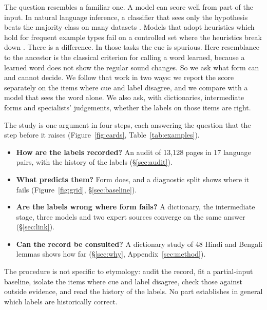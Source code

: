 \documentclass[11pt]{article}
\begin{document}
The question resembles a familiar one. A model can score well from part of the input. In natural language inference, a classifier that sees only the hypothesis beats the majority class on many datasets \citep{poliak2018hypothesis,gururangan2018annotation}. Models that adopt heuristics which hold for frequent example types fail on a controlled set where the heuristics break down \citep{mccoy2019right}. There is a difference. In those tasks the cue is spurious. Here resemblance to the ancestor is the classical criterion for calling a word learned, because a learned word does not show the regular sound changes. So we ask what form can and cannot decide. We follow that work in two ways: we report the score separately on the items where cue and label disagree, and we compare with a model that sees the word alone. We also ask, with dictionaries, intermediate forms and specialists' judgements, whether the labels on those items are right.

The study is one argument in four steps, each answering the question that the step before it raises (Figure~\ref{fig:cards}, Table~\ref{tab:examples}).
\begin{itemize}
\item \textbf{How are the labels recorded?} An audit of 13,128 pages in 17 language pairs, with the history of the labels (\S\ref{sec:audit}).
\item \textbf{What predicts them?} Form does, and a diagnostic split shows where it fails (Figure~\ref{fig:grid}, \S\ref{sec:baseline}).
\item \textbf{Are the labels wrong where form fails?} A dictionary, the intermediate stage, three models and two expert sources converge on the same answer (\S\ref{sec:link}).
\item \textbf{Can the record be consulted?} A dictionary study of 48 Hindi and Bengali lemmas shows how far (\S\ref{sec:why}, Appendix~\ref{sec:method}).
\end{itemize}
The procedure is not specific to etymology: audit the record, fit a partial-input baseline, isolate the items where cue and label disagree, check those against outside evidence, and read the history of the labels. No part establishes in general which labels are historically correct.
\end{document}
